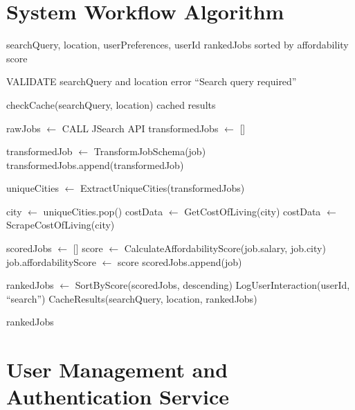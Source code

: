 \documentclass[12pt,a4paper,oneside]{report}
\begin{document}
\section{System Workflow Algorithm}

\begin{algorithm}
\caption{Job Search and Affordability Scoring Workflow}
\label{alg:workflow}
\begin{algorithmic}[1]
\Require searchQuery, location, userPreferences, userId
\Ensure rankedJobs sorted by affordability score

\State VALIDATE searchQuery and location
    \State \Return error ``Search query required''
\EndIf

\State checkCache(searchQuery, location)
    \State \Return cached results
\EndIf

\State rawJobs $\leftarrow$ CALL JSearch API
\State transformedJobs $\leftarrow$ []

    \State transformedJob $\leftarrow$ TransformJobSchema(job)
    \State transformedJobs.append(transformedJob)
\EndFor

\State uniqueCities $\leftarrow$ ExtractUniqueCities(transformedJobs)

    \State city $\leftarrow$ uniqueCities.pop()
    \State costData $\leftarrow$ GetCostOfLiving(city)
        \State costData $\leftarrow$ ScrapeCostOfLiving(city)
    \EndIf
\EndWhile

\State scoredJobs $\leftarrow$ []
    \State score $\leftarrow$ CalculateAffordabilityScore(job.salary, job.city)
    \State job.affordabilityScore $\leftarrow$ score
    \State scoredJobs.append(job)
\EndFor

\State rankedJobs $\leftarrow$ SortByScore(scoredJobs, descending)
\State LogUserInteraction(userId, ``search'')
\State CacheResults(searchQuery, location, rankedJobs)

\State \Return rankedJobs
\end{algorithmic}
\end{algorithm}

\section{User Management and Authentication Service}
\end{document}

